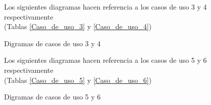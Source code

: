 \begin{figure}[H]
	\centering
	Los siguientes diagramas hacen referencia a los casos de uso 3 y 4 respectivamente\\(Tablas \ref{Caso_de_uso_3} y \ref{Caso_de_uso_4})
 	\caption{Digramas de casos de uso 3 y 4}
\end{figure}

\begin{figure}[H]
	\centering
	Los siguientes diagramas hacen referencia a los casos de uso 5 y 6 respectivamente\\(Tablas \ref{Caso_de_uso_5} y \ref{Caso_de_uso_6})
 	\caption{Digramas de casos de uso 5 y 6}
\end{figure}

